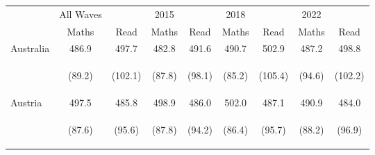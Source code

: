 \begin{center}
\begin{tabular}{lcccccccc}
\hline \noalign{\smallskip} & All Waves &  & 2015 &  & 2018 &  & 2022 & \\
 & Maths & Read & Maths & Read & Maths & Read & Maths & Read\\
\noalign{\smallskip}\hline \noalign{\smallskip}Australia & 486.9 & 497.7 & 482.8 & 491.6 & 490.7 & 502.9 & 487.2 & 498.8\\
 & \begin{footnotesize}(89.2)\end{footnotesize} & \begin{footnotesize}(102.1)\end{footnotesize} & \begin{footnotesize}(87.8)\end{footnotesize} & \begin{footnotesize}(98.1)\end{footnotesize} & \begin{footnotesize}(85.2)\end{footnotesize} & \begin{footnotesize}(105.4)\end{footnotesize} & \begin{footnotesize}(94.6)\end{footnotesize} & \begin{footnotesize}(102.2)\end{footnotesize}\\
\noalign{\smallskip}Austria & 497.5 & 485.8 & 498.9 & 486.0 & 502.0 & 487.1 & 490.9 & 484.0\\
 & \begin{footnotesize}(87.6)\end{footnotesize} & \begin{footnotesize}(95.6)\end{footnotesize} & \begin{footnotesize}(87.8)\end{footnotesize} & \begin{footnotesize}(94.2)\end{footnotesize} & \begin{footnotesize}(86.4)\end{footnotesize} & \begin{footnotesize}(95.7)\end{footnotesize} & \begin{footnotesize}(88.2)\end{footnotesize} & \begin{footnotesize}(96.9)\end{footnotesize}\\

\end{tabular}
\end{center}
